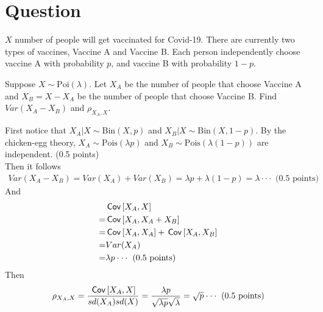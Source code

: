\section{Question}
$X$ number of people will get vaccinated for Covid-19. There are currently two types of vaccines, Vaccine A and Vaccine B. Each person independently choose vaccine A with probability $p$, and vaccine B with probability $1-p.$
\begin{exercise}[2]
 Suppose $X\sim\text{Poi}(\lambda).$ Let $X_A$ be the number of people that choose Vaccine A and $X_B=X-X_A$ be the number of people that choose Vaccine B. Find $Var(X_A-X_B)$ and $\rho_{X_A,X}.$

\begin{solution}
First notice that $X_A|X \sim \text{Bin}(X, p)$ and $X_B |X \sim \text{Bin}(X, 1-p)$. By the chicken-egg theory, $X_A\sim\text{Pois}(\lambda p)$ and $X_B \sim \text{Pois}(\lambda (1-p))$ are independent. (0.5 points)\\
Then it follows
\begin{align*}
    Var(X_A-X_B)=Var(X_A)+Var(X_B)=\lambda p+\lambda(1-p)=\lambda  \cdot \cdot \cdot \text{ (0.5 points)}
\end{align*}
And
\begin{align*}
    &\,\mathsf{Cov}\left[X_A,X\right]\\
    =&\,\mathsf{Cov}\left[X_A,X_A+X_B\right]\\
    =&\,\mathsf{Cov}\left[X_A,X_A\right]+\,\mathsf{Cov}\left[X_A,X_B\right]\\
    =&Var(X_A)\\
    =&\lambda p  \cdot \cdot \cdot \text{ (0.5 points)}\\
\end{align*}
Then $$  \rho_{X_A,X}
    =\frac{\,\mathsf{Cov}\left[X_A,X\right]}{sd(X_A)sd(X)}
    =\frac{\lambda p}{\sqrt{\lambda p}\sqrt{\lambda}}
    =\sqrt{p}\cdot \cdot \cdot \text{ (0.5 points)}$$
\end{solution}
\end{exercise}

